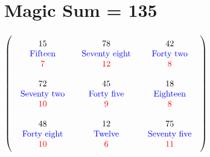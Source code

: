 \documentclass{article}
\begin{document}
\vspace{2em} 
\section{Magic Sum = 135}$ \left( \begin{array}{ccc}
\begin{array}{c}
\rule{0pt}{1.5em}15 \\ 
\text{\color{blue}Fifteen} \\ 
\color{red}7 \vspace{.5em} 
\end{array} & \begin{array}{c}
\rule{0pt}{1.5em}78 \\ 
\text{\color{blue}Seventy eight} \\ 
\color{red}12 \vspace{.5em} 
\end{array} & \begin{array}{c}
\rule{0pt}{1.5em}42 \\ 
\text{\color{blue}Forty two} \\ 
\color{red}8 \vspace{.5em} 
\end{array}\\ 
\begin{array}{c}
\rule{0pt}{1.5em}72 \\ 
\text{\color{blue}Seventy two} \\ 
\color{red}10 \vspace{.5em} 
\end{array} & \begin{array}{c}
\rule{0pt}{1.5em}45 \\ 
\text{\color{blue}Forty five} \\ 
\color{red}9 \vspace{.5em} 
\end{array} & \begin{array}{c}
\rule{0pt}{1.5em}18 \\ 
\text{\color{blue}Eighteen} \\ 
\color{red}8 \vspace{.5em} 
\end{array}\\ 
\begin{array}{c}
\rule{0pt}{1.5em}48 \\ 
\text{\color{blue}Forty eight} \\ 
\color{red}10 \vspace{.5em} 
\end{array} & \begin{array}{c}
\rule{0pt}{1.5em}12 \\ 
\text{\color{blue}Twelve} \\ 
\color{red}6 \vspace{.5em} 
\end{array} & \begin{array}{c}
\rule{0pt}{1.5em}75 \\ 
\text{\color{blue}Seventy five} \\ 
\color{red}11 \vspace{.5em} 
\end{array}\end{array} \right) $
\end{document}
